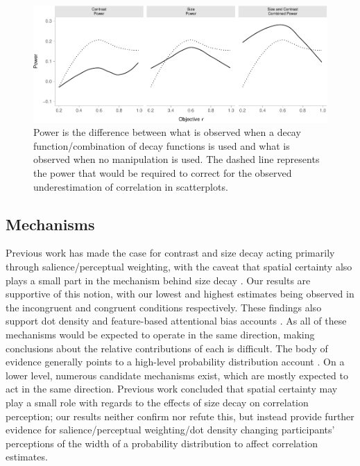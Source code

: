 \documentclass[manuscript, review, anonymous, screen]{acmart}
\begin{document}
\begin{figure}

{\centering \includegraphics[width=1\textwidth,height=\textheight]{size_and_contrast_files/figure-pdf/fig-power-plot-1.pdf}

}

\caption{\label{fig-power-plot}Power is the difference between what is
observed when a decay function/combination of decay functions is used
and what is observed when no manipulation is used. The dashed line
represents the power that would be required to correct for the observed
underestimation of correlation in scatterplots.}
\end{figure}

\hypertarget{sec-mechs}{%
\subsection{Mechanisms}\label{sec-mechs}}

Previous work has made the case for contrast and size decay acting
primarily through salience/perceptual weighting, with the caveat that
spatial certainty also plays a small part in the mechanism behind size
decay \citep{strain_2023, strain_2023b}. Our results are supportive of
this notion, with our lowest and highest estimates being observed in the
incongruent and congruent conditions respectively. These findings also
support dot density \citep{yang_2023} and feature-based attentional bias
accounts \citep{hong_2021, sun_2016}. As all of these mechanisms would
be expected to operate in the same direction, making conclusions about
the relative contributions of each is difficult. The body of evidence
generally points to a high-level probability distribution account
\citep{rensink_2017, rensink_2022}. On a lower level, numerous candidate
mechanisms exist, which are mostly expected to act in the same
direction. Previous work concluded that spatial certainty
\citep{strain_2023b} may play a small role with regards to the effects
of size decay on correlation perception; our results neither confirm nor
refute this, but instead provide further evidence for
salience/perceptual weighting/dot density changing participants'
perceptions of the width of a probability distribution to affect
correlation estimates.
\end{document}
